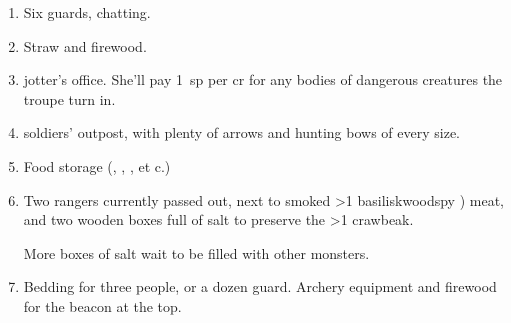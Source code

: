 \begin{multicols}{2}
\begin{enumerate}
  \item
  Six \glspl{guard}, chatting.
  \label{cinderBase}
  \item
  Straw and firewood.
  \label{cinderStraw}
  \item
  \Gls{jotter}'s office.
  She'll pay 1~\gls{sp} per \gls{cr} for any bodies of dangerous creatures the troupe turn in.
  \label{cinderOffice}
  \item
  \Glspl{soldier}' outpost, with plenty of arrows and hunting bows of every size.
  \label{cinderBows}
  \item
  Food storage (\rations, \rations, \rations, et c.)
  \label{cinderFood}
  \item
  Two \glspl{ranger} currently passed out, next to smoked
  \ifnum\value{temperature}>1 \gls{basilisk}\else\gls{woodspy}\fi%
  )
  meat, and two wooden boxes full of salt to preserve the
  \ifnum\value{temperature}>1 craw\else beak\fi.

  More boxes of salt wait to be filled with other \glspl{monster}.
  \label{cinderUpper}
  \item
  Bedding for three people, or a dozen \gls{guard}.
  Archery equipment and firewood for the beacon at the top.
  \label{cinderBeds}
\end{enumerate}

\end{multicols}
